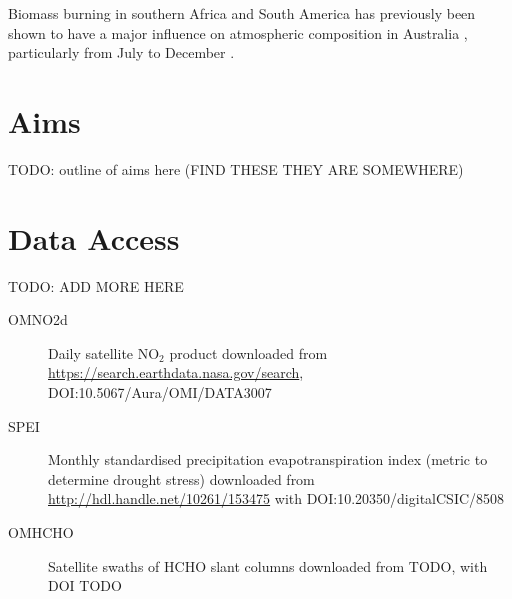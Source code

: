   Biomass burning in southern Africa and South America has previously been shown to have a major influence on atmospheric composition in Australia \citep{Oltmans2001, Gloudemans2006, Edwards2006}, particularly from July to December \citep{Pak2003, Liu2016}.
  
\section{Aims}
\label{LR:Aims}
TODO: outline of aims here (FIND THESE THEY ARE SOMEWHERE)

\section{Data Access}
TODO: ADD MORE HERE
\label{LR:DataAccess}
\begin{description}
  \item[OMNO2d] Daily satellite NO$_2$ product downloaded from \url{https://search.earthdata.nasa.gov/search}, DOI:10.5067/Aura/OMI/DATA3007
  
  \item[SPEI] Monthly standardised precipitation evapotranspiration index (metric to determine drought stress) downloaded from \url{http://hdl.handle.net/10261/153475} with DOI:10.20350/digitalCSIC/8508
  
  \item[OMHCHO] Satellite swaths of HCHO slant columns downloaded from TODO, with DOI TODO
  
\end{description}